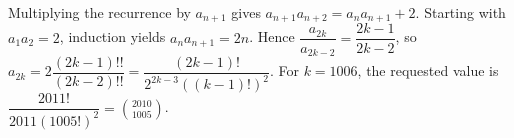 Multiplying the recurrence by $a_{n+1}$ gives $a_{n+1}a_{n+2}=a_na_{n+1}+2$. Starting with $a_1a_2=2$, induction yields $a_na_{n+1}=2n$. Hence $\dfrac{a_{2k}}{a_{2k-2}} = \dfrac{2k-1}{2k-2}$, so $a_{2k}=2\dfrac{(2k-1)!!}{(2k-2)!!}=\dfrac{(2k-1)!}{2^{2k-3}((k-1)!)^2}$. For $k=1006$, the requested value is $\dfrac{2011!}{2011(1005!)^2}=\boxed{\binom{2010}{1005}}$.
